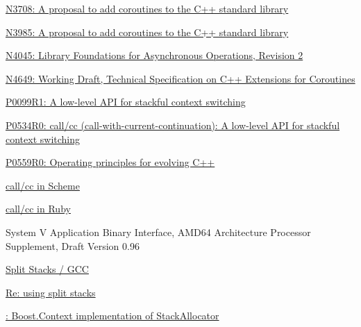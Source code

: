\newpage
{}
\begin{thebibliography}{99}

        \href{http://www.open-std.org/jtc1/sc22/wg21/docs/papers/2013/n3708.pdf}
        {N3708: A proposal to add coroutines to the C++ standard library}

        \href{http://www.open-std.org/jtc1/sc22/wg21/docs/papers/2013/n3985.pdf}
        {N3985: A proposal to add coroutines to the C++ standard library}

        \href{http://www.open-std.org/jtc1/sc22/wg21/docs/papers/2014/n4045.pdf}
        {N4045: Library Foundations for Asynchronous Operations, Revision 2}

        \href{http://www.open-std.org/jtc1/sc22/wg21/docs/papers/2017/n4649.pdf}
        {N4649: Working Draft, Technical Specification on C++ Extensions for Coroutines}

        \href{http://www.open-std.org/jtc1/sc22/wg21/docs/papers/2016/p0099r1.pdf}
        {P0099R1: A low-level API for stackful context switching}

        \href{http://www.open-std.org/jtc1/sc22/wg21/docs/papers/2017/p0534r0.pdf}
        {P0534R0: call/cc (call-with-current-continuation): A low-level API for stackful
        context switching}

        \href{http://www.open-std.org/jtc1/sc22/wg21/docs/papers/2017/p0559r0.pdf}
        {P0559R0: Operating principles for evolving C++}

        \href{http://community.schemewiki.org/?call-with-current-continuation}
        {call/cc in Scheme}

        \href{http://gnuu.org/2009/03/21/demystifying-continuations-in-ruby}
        {call/cc in Ruby}

        {System V Application Binary Interface, AMD64 Architecture Processor Supplement,
        Draft Version 0.96}

        \href{http://gcc.gnu.org/wiki/SplitStacks}
        {Split Stacks / GCC}

        \href{https://gcc.gnu.org/ml/gcc-help/2012-03/msg00395.html}
        {Re: using split stacks}

        \href{https://github.com/boostorg/context/blob/master/include/boost/context/posix/segmented_stack.hpp}
        {: Boost.Context implementation
        of  StackAllocator}


\end{thebibliography}
